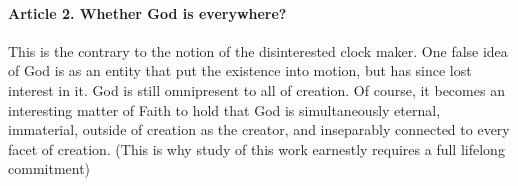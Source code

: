 \documentclass{ucetd}
\begin{document}
\paragraph{Article 2. Whether God is everywhere?}
This is the contrary to the notion of the disinterested clock maker. One false idea of God is as an entity that put the existence into motion, but has since lost interest in it. God is still omnipresent to all of creation. Of course, it becomes an interesting matter of Faith to hold that God is simultaneously eternal, immaterial, outside of creation as the creator, and inseparably connected to every facet of creation. (This is why study of this work earnestly requires a full lifelong commitment)
\end{document}
